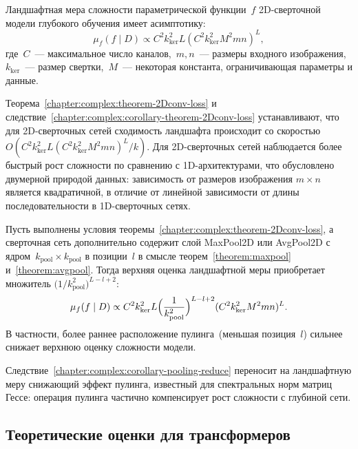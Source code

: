 \begin{corollary}\label{chapter:complex:corollary-theorem-2Dconv-loss}
    Ландшафтная мера сложности параметрической функции~$f$ 2D-сверточной модели глубокого обучения имеет асимптотику:
    \[
        \mu_f(f\mid D) \propto C^2k_{\mathrm{ker}}^2L(C^2k_{\mathrm{ker}}^2M^2mn)^{L},
    \]
    где~$C$~--- максимальное число каналов,~$m,n$~--- размеры входного изображения,~$k_{\mathrm{ker}}$~--- размер свертки,~$M$~--- некоторая константа, ограничивающая параметры и данные.
\end{corollary}

Теорема~\ref{chapter:complex:theorem-2Dconv-loss} и следствие~\ref{chapter:complex:corollary-theorem-2Dconv-loss} устанавливают, что для 2D-сверточных сетей сходимость ландшафта происходит со скоростью $O(C^2k_{\mathrm{ker}}^2L(C^2k_{\mathrm{ker}}^2M^2mn)^{L}/k)$. Для 2D-сверточных сетей наблюдается более быстрый рост сложности по сравнению с 1D-архитектурами, что обусловлено двумерной природой данных: зависимость от размеров изображения $m \times n$ является квадратичной, в отличие от линейной зависимости от длины последовательности в 1D-сверточных сетях.

\begin{corollary}\label{chapter:complex:corollary-pooling-reduce}
Пусть выполнены условия теоремы~\ref{chapter:complex:theorem-2Dconv-loss}, а сверточная сеть дополнительно содержит слой MaxPool2D или AvgPool2D с ядром~$k_{\mathrm{pool}}\times k_{\mathrm{pool}}$ в позиции~$l$ в смысле теорем~\ref{theorem:maxpool} и~\ref{theorem:avgpool}.
Тогда верхняя оценка ландшафтной меры приобретает множитель $\bigl(1/k_{\mathrm{pool}}^2\bigr)^{L-l+2}$:
\[
    \mu_f(f\mid D) \propto C^2k_{\mathrm{ker}}^2L\Bigl(\frac{1}{k_{\mathrm{pool}}^2}\Bigr)^{L-l+2}(C^2k_{\mathrm{ker}}^2M^2mn)^{L}.
\]
В частности, более раннее расположение пулинга~(меньшая позиция~$l$) сильнее снижает верхнюю оценку сложности модели.
\end{corollary}

Следствие~\ref{chapter:complex:corollary-pooling-reduce} переносит на ландшафтную меру снижающий эффект пулинга, известный для спектральных норм матриц Гессе: операция пулинга частично компенсирует рост сложности с глубиной сети.

\subsection{Теоретические оценки для трансформеров}

